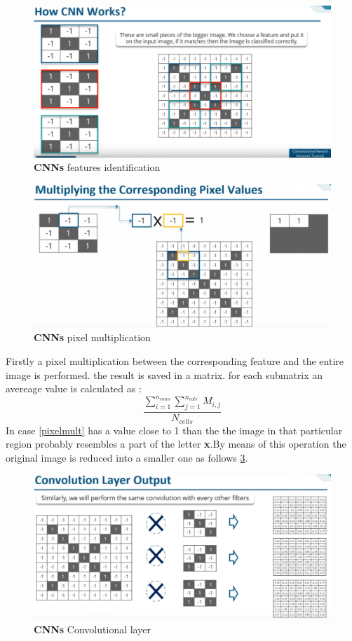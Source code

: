 \documentclass[11pt]{article}
\begin{document}
\begin{figure}[h]
\centering
\captionsetup{justification=centering}
\includegraphics[width=0.9\linewidth]{CNN6.pdf}
\caption{ \textbf{CNNs}  features identification }
\label{fig:CNN6}
\end{figure}
\clearpage
\begin{figure}[h]
\centering
\captionsetup{justification=centering}
\includegraphics[width=0.9\linewidth]{CNN7.pdf}
\caption{ \textbf{CNNs}  pixel multiplication }
\label{fig:CNN7}
\end{figure}
Firstly  a pixel multiplication between the corresponding feature and the entire image is performed. the result is saved in a matrix. for each submatrix an avereage value is calculated as :
\begin{equation}
    \frac{\sum_{i=1}^{n_{rows}}\sum_{j=1}^{n_{cols}} M_{i,j}}{N_{cells}}
    \label{pixelmult}
\end{equation}{}
In case \ref{pixelmult} has a value close to 1 than the the image in that particular region probably resembles a part of the letter \textbf{x}.By means of this operation   the original image is reduced into a smaller one as follows \ref{fig:CNN8}.
\begin{figure}[h]
\centering
\captionsetup{justification=centering}
\includegraphics[width=0.9\linewidth]{CNN8.pdf}
\caption{ \textbf{CNNs} Convolutional layer }
\label{fig:CNN8}
\end{figure}
\end{document}
